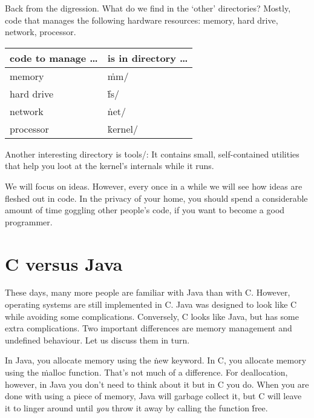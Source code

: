 \smallskip

Back from the digression.
What do we find in the `other' directories?
Mostly, code that manages the following hardware resources:
  memory, hard drive, network, processor.
\begin{center}
\begin{tabular}{@{}ll@{}}
\toprule
code to manage \dots & is in directory \dots \\
\midrule
memory & \.{mm/} \\
hard drive & \.{fs/} \\
network & \.{net/} \\
processor & \.{kernel/} \\
\bottomrule
\end{tabular}
\end{center}
Another interesting directory is \.{tools/}:
  It contains small, self-contained utilities
    that help you loot at the kernel's internals while it runs.

We will focus on ideas.
However,
  every once in a while we will see how ideas are fleshed out in code.
In the privacy of your home,
  you should spend a considerable amount of time goggling other people's code,
  if you want to become a good programmer.


\section{C versus Java}

These days, many more people are familiar with Java than with C\null.
However, operating systems are still implemented in C\null.
Java was designed to look like C while avoiding some complications.
Conversely, C looks like Java, but has some extra complications.
Two important differences are memory management and undefined behaviour.
Let us discuss them in turn.

\smallskip

In Java, you allocate memory using the \.{new} keyword.
In C, you allocate memory using the \.{malloc} function.
That's not much of a difference.
For deallocation, however,
  in Java you don't need to think about it but in C you do.
When you are done with using a piece of memory,
  Java will garbage collect it,
  but C will leave it to linger around until \emph{you} throw it away
    by calling the function \.{free}.

\smallskip


